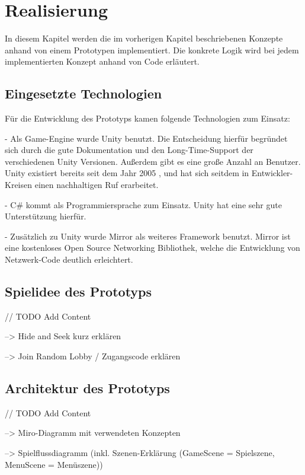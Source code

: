 \chapter{Realisierung}
\label{sec:realisierung}

In diesem Kapitel werden die im vorherigen Kapitel beschriebenen Konzepte anhand von einem Prototypen implementiert. Die konkrete Logik wird bei jedem implementierten Konzept anhand von Code erläutert.

\section{Eingesetzte Technologien}

Für die Entwicklung des Prototyps kamen folgende Technologien zum Einsatz:

- Als Game-Engine wurde Unity\cite{Technologies.03.02.2022} benutzt. Die Entscheidung hierfür begründet sich durch die gute Dokumentation und den Long-Time-Support der verschiedenen Unity Versionen. Außerdem gibt es eine große Anzahl an Benutzer. Unity existiert bereits seit dem Jahr 2005 \cite{Wikipedia.2022c}, und hat sich seitdem in Entwickler-Kreisen einen nachhaltigen Ruf erarbeitet.

- C\# kommt als Programmiersprache zum Einsatz. Unity hat eine sehr gute Unterstützung hierfür.

- Zusätzlich zu Unity wurde Mirror\cite{.03.02.2022} als weiteres Framework benutzt. Mirror ist eine kostenloses Open Source Networking Bibliothek, welche die Entwicklung von Netzwerk-Code deutlich erleichtert.

\section{Spielidee des Prototyps}
\label{Spielidee}

// TODO Add Content

--> Hide and Seek kurz erklären

--> Join Random Lobby / Zugangscode erklären

\section{Architektur des Prototyps}
\label{Architektur}

// TODO Add Content

--> Miro-Diagramm mit verwendeten Konzepten

--> Spielflussdiagramm (inkl. Szenen-Erklärung (GameScene = Spielszene, MenuScene = Menüszene))

